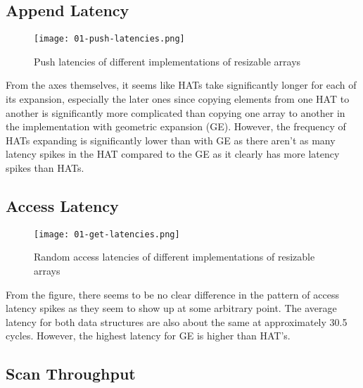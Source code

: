 \begingroup

\subsection{Append Latency}

\begin{figure}[H]
	\begin{center}
		\texttt{[image: 01-push-latencies.png]}
		\caption{Push latencies of different implementations of resizable arrays}
		\label{fig:push-latency}
	\end{center}
\end{figure}

From the axes themselves, it seems like HATs take significantly longer for each of its expansion, especially the later ones since copying elements from one HAT to another is significantly more complicated than copying one array to another in the implementation with geometric expansion (GE). However, the frequency of HATs expanding is significantly lower than with GE as there aren't as many latency spikes in the HAT compared to the GE as it clearly has more latency spikes than HATs.

\endgroup

\begingroup

\subsection{Access Latency}

\begin{figure}[H]
	\begin{center}
		\texttt{[image: 01-get-latencies.png]}
		\caption{Random access latencies of different implementations of resizable arrays}
		\label{fig:get-latency}
	\end{center}
\end{figure}

From the figure, there seems to be no clear difference in the pattern of access latency spikes as they seem to show up at some arbitrary point. The average latency for both data structures are also about the same at approximately 30.5 cycles. However, the highest latency for GE is higher than HAT's.

\endgroup

\begingroup

\subsection{Scan Throughput}

